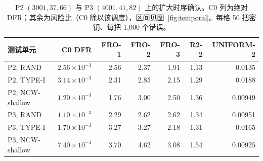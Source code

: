 \begin{table}[!t]
\centering
\small
\caption{P2 $(3001,37,66)$ 与 P3 $(4001,41,82)$ 上的扩大时序确认。C0 列为绝对 DFR；其余为风险比（C0 除以该调度），区间见图~\ref{fig:temporal}。每格 50 把密钥、每把 1{,}000 个错误。}
\label{tab:temporal}
\begin{tabular}{l r rrrrr}
\toprule
测试单元 & C0 DFR & FRO-1 & FRO-2 & FRO-3 & R2-2 & UNIFORM-2 \\
\midrule
P2, RAND & $2.56\times10^{-3}$ & 2.56 & 2.37 & 1.91 & 1.13 & 0.0135 \\
P2, TYPE-I & $3.14\times10^{-3}$ & 2.31 & 2.85 & 2.15 & 1.29 & 0.0188 \\
P2, NCW-shallow & $1.20\times10^{-3}$ & 1.76 & 3.00 & 2.50 & 1.36 & 0.00949 \\
P3, RAND & $1.10\times10^{-3}$ & 2.29 & 2.62 & 2.62 & 1.34 & 0.00951 \\
P3, TYPE-I & $1.70\times10^{-3}$ & 3.27 & 3.27 & 2.18 & 1.31 & 0.0165 \\
P3, NCW-shallow & $7.40\times10^{-4}$ & 3.70 & 4.62 & 3.08 & 1.54 & 0.00925 \\
\bottomrule
\end{tabular}
\end{table}

